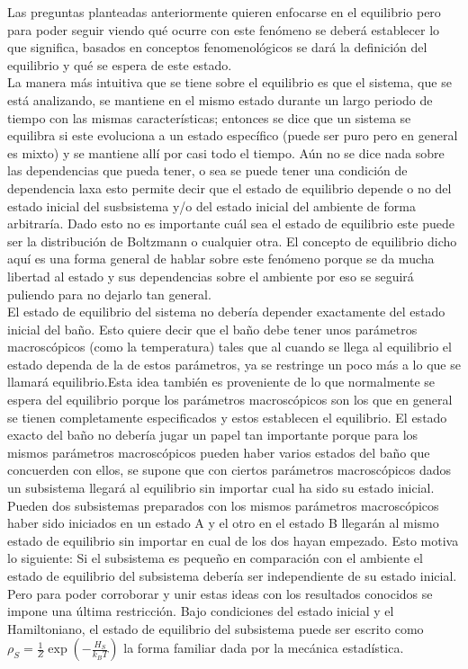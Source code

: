 Las preguntas planteadas anteriormente quieren enfocarse en el equilibrio pero para poder seguir viendo qué ocurre   con este fenómeno se deberá establecer lo que significa, basados en conceptos fenomenológicos se dará la  definición del equilibrio y qué se espera de este estado.
\\
La manera más intuitiva que se tiene sobre el equilibrio es que el sistema, que se está analizando, se mantiene en el mismo estado durante un largo periodo de tiempo con las mismas características; entonces se dice que un sistema se equilibra si este evoluciona a un estado específico (puede ser puro pero en general es mixto) y se mantiene allí por casi todo el tiempo. Aún no se dice nada  sobre las dependencias que pueda tener, o sea se puede tener una condición de dependencia laxa esto permite decir que el estado de equilibrio depende o no del estado inicial del susbsistema y/o del estado inicial del ambiente de forma arbitraría. Dado esto no es importante cuál sea el estado de equilibrio este puede ser la distribución de Boltzmann o cualquier otra. El concepto de equilibrio dicho aquí es una forma general de hablar sobre este fenómeno porque se da mucha libertad al estado y sus dependencias sobre el ambiente por eso se seguirá puliendo para no dejarlo tan general.
\\
El  estado de equilibrio del sistema no debería depender exactamente del estado inicial del baño. Esto quiere decir que el baño debe tener unos parámetros macroscópicos (como la temperatura) tales que al cuando se llega al equilibrio el estado dependa de la de estos parámetros, ya se restringe un poco más a lo que se llamará equilibrio.Esta idea también es proveniente de lo que normalmente se espera del equilibrio porque los parámetros macroscópicos son los que en general se tienen completamente especificados y estos establecen el equilibrio. El estado exacto del baño no debería jugar un papel  tan importante porque para los mismos parámetros macroscópicos pueden haber varios estados del baño que concuerden con ellos, se supone que con ciertos parámetros macroscópicos dados  un subsistema llegará al equilibrio sin importar cual ha sido su estado inicial. Pueden dos subsistemas preparados con los mismos parámetros macroscópicos haber sido iniciados en un estado A y el otro en el estado B llegarán al mismo estado de equilibrio sin importar en cual de los dos hayan empezado.  Esto motiva lo siguiente:
Si el subsistema es pequeño en comparación con el ambiente el estado de equilibrio del subsistema debería ser independiente de su estado inicial. Pero para poder corroborar y unir estas ideas con los resultados conocidos se impone una última restricción. Bajo condiciones del estado inicial y el Hamiltoniano, el estado de equilibrio del subsistema puede ser escrito como $\rho_{S}= \frac{1}{Z} \exp(-\frac{H_{S}}{k_{B}T})$ la forma familiar dada por la mecánica estadística.
